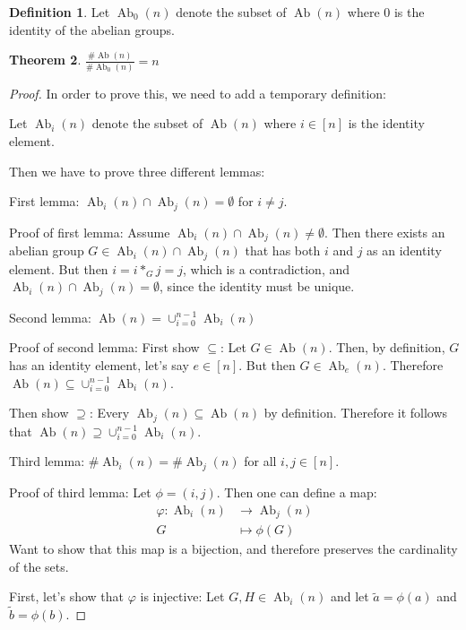 \documentclass[a4paper, 12pt, english]{article}
\theoremstyle{plain}
\newtheorem{theorem}{Theorem}[section]
\theoremstyle{definition}
\newtheorem{definition}[theorem]{Definition}
\DeclareMathOperator{\Ab}{Ab}
\begin{document}
\begin{definition}
    Let \( \Ab_0(n) \) denote the subset of \( \Ab(n) \) where \( 0 \) is the identity of the abelian groups.
\end{definition}

\begin{theorem}
    \( \frac{\#\Ab(n)}{\#\Ab_0(n)} = n \)
\end{theorem}
\begin{proof}
    In order to prove this, we need to add a temporary definition:

    Let \( \Ab_i(n) \) denote the subset of \( \Ab(n) \) where \( i \in [n] \) is the identity element.

    Then we have to prove three different lemmas:

    First lemma: \( \Ab_i(n) \cap \Ab_j(n) = \emptyset \) for \( i \neq j \).

    Proof of first lemma: Assume \( \Ab_i(n) \cap \Ab_j(n) \neq \emptyset \). Then there exists an abelian group \( G \in \Ab_i(n) \cap \Ab_j(n) \) that has both \( i \) and \( j \) as an identity element. But then \( i = i *_G j = j \), which is a contradiction, and \( \Ab_i(n) \cap \Ab_j(n) = \emptyset \), since the identity must be unique.

    Second lemma: \( \Ab(n) = \cup_{i=0}^{n-1} \Ab_i(n) \)

    Proof of second lemma: First show \( \subseteq \): Let \( G \in \Ab(n) \). Then, by definition, \( G \) has an identity element, let's say \( e \in [n] \). But then \( G \in \Ab_e(n) \). Therefore \( \Ab(n) \subseteq \cup_{i=0}^{n-1} \Ab_i(n) \).

    Then show \( \supseteq \): Every \( \Ab_j(n) \subseteq \Ab(n) \) by definition. Therefore it follows that \( \Ab(n) \supseteq \cup_{i=0}^{n-1} \Ab_i(n) \).

    Third lemma: \( \#\Ab_i(n) = \#\Ab_j(n) \) for all \( i, j \in [n] \).

    Proof of third lemma: Let \( \phi = (i, j) \). Then one can define a map:
    \begin{align*}
        \varphi: \Ab_i(n) &\to \Ab_j(n) \\
        G &\mapsto \phi(G)
    \end{align*}
    Want to show that this map is a bijection, and therefore preserves the cardinality of the sets.

    First, let's show that \( \varphi \) is injective: Let \( G, H \in \Ab_i(n) \) and let \( \tilde{a} = \phi(a) \) and \( \tilde{b} = \phi(b) \).


\end{proof}
\end{document}
